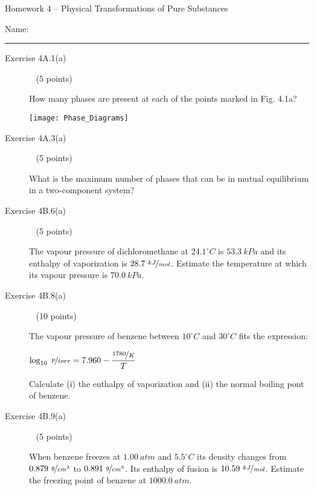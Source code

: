 \documentclass[12pt, openany, letterpaper]{memoir}
\begin{document}
\begin{center}
	{\large Homework 4 -- Physical Transformations of Pure Substances}
\end{center}

Name: \rule[-.1mm]{15em}{0.1pt}

\begin{description}
	\item [Exercise 4A.1(a)] ~ (5 points)

	      How many phases are present at each of the points marked in Fig. 4.1a?

	      \noindent\texttt{[image: Phase\_Diagrams]}
	\item [Exercise 4A.3(a)] ~ (5 points)

	      What is the maximum number of phases that can be in mutual equilibrium in a two-component system?

	      \vspace{10em}
	\item [Exercise 4B.6(a)] ~ (5 points)

	      The vapour pressure of dichloromethane at $24.1^\circ C$ is $53.3~kPa$ and its enthalpy of vaporization is $28.7~\nicefrac{kJ}{mol}$. Estimate the temperature at which its vapour pressure is $70.0~kPa$.



	      \vspace{10em}
	\item [Exercise 4B.8(a)] ~ (10 points)

	      The vapour pressure of benzene between $10^\circ C$ and $30^\circ C$ fits the expression:

	      $\log_{10}~\nicefrac{p}{torr} = 7.960-\dfrac{\nicefrac{1780}{K}}{T}$

	      Calculate (i) the enthalpy of vaporization and (ii) the normal boiling pont of benzene.

	      \vspace{20em}
	\item [Exercise 4B.9(a)] ~ (5 points)

	      When benzene freezes at $1.00~atm$ and $5.5^\circ C$ its density changes from $0.879~\nicefrac{g}{cm^3}$ to $0.891~\nicefrac{g}{cm^3}$. Its enthalpy of fusion is $10.59~\nicefrac{kJ}{mol}$. Estimate the freezing point of benzene at $1000.0~atm$.

	      \vspace{15em}
\end{description}
\end{document}

